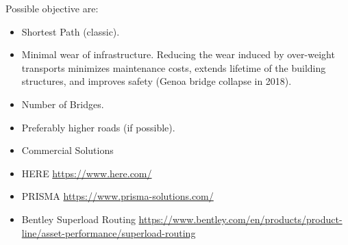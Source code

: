 Possible objective are:
\begin{itemize}
  \item Shortest Path (classic).

  \item Minimal wear of infrastructure. Reducing the wear induced by over-weight transports
  minimizes maintenance costs, extends lifetime of the building structures, and
  improves safety (Genoa bridge collapse in 2018).


  \item Number of Bridges.
  \item Preferably higher roads (if possible).
\end{itemize}

\begin{itemize}





\item Commercial Solutions

\item HERE
\url{https://www.here.com/}
\item PRISMA
\url{https://www.prisma-solutions.com/}

\item Bentley Superload Routing
\url{https://www.bentley.com/en/products/product-line/asset-performance/superload-routing}

\end{itemize}
